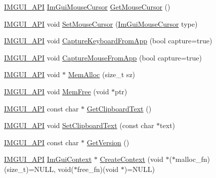 \begin{DoxyCompactItemize}
\mbox{\hyperlink{imgui_8h_a43829975e84e45d1149597467a14bbf5}{I\+M\+G\+U\+I\+\_\+\+A\+PI}} \mbox{\hyperlink{imgui_8h_a9223d6c82bb5d12c2eab5f829ca520ef}{Im\+Gui\+Mouse\+Cursor}} \mbox{\hyperlink{namespace_im_gui_a3b955bb840a2411f7c19ac6687d57392}{Get\+Mouse\+Cursor}} ()
\item 
\mbox{\hyperlink{imgui_8h_a43829975e84e45d1149597467a14bbf5}{I\+M\+G\+U\+I\+\_\+\+A\+PI}} void \mbox{\hyperlink{namespace_im_gui_ae212a3516efcba50a684df202c8e63ad}{Set\+Mouse\+Cursor}} (\mbox{\hyperlink{imgui_8h_a9223d6c82bb5d12c2eab5f829ca520ef}{Im\+Gui\+Mouse\+Cursor}} type)
\item 
\mbox{\hyperlink{imgui_8h_a43829975e84e45d1149597467a14bbf5}{I\+M\+G\+U\+I\+\_\+\+A\+PI}} void \mbox{\hyperlink{namespace_im_gui_af382f9360d73917a9e9c0d26b5797552}{Capture\+Keyboard\+From\+App}} (bool capture=true)
\item 
\mbox{\hyperlink{imgui_8h_a43829975e84e45d1149597467a14bbf5}{I\+M\+G\+U\+I\+\_\+\+A\+PI}} void \mbox{\hyperlink{namespace_im_gui_a3a86fbf0d334b30dc16fb44955f1ce54}{Capture\+Mouse\+From\+App}} (bool capture=true)
\item 
\mbox{\hyperlink{imgui_8h_a43829975e84e45d1149597467a14bbf5}{I\+M\+G\+U\+I\+\_\+\+A\+PI}} void $\ast$ \mbox{\hyperlink{namespace_im_gui_a15efb2cac4a54b35489c5984ba1b661a}{Mem\+Alloc}} (size\+\_\+t sz)
\item 
\mbox{\hyperlink{imgui_8h_a43829975e84e45d1149597467a14bbf5}{I\+M\+G\+U\+I\+\_\+\+A\+PI}} void \mbox{\hyperlink{namespace_im_gui_a269ec695c6e722ec3da85dae37f0675d}{Mem\+Free}} (void $\ast$ptr)
\item 
\mbox{\hyperlink{imgui_8h_a43829975e84e45d1149597467a14bbf5}{I\+M\+G\+U\+I\+\_\+\+A\+PI}} const char $\ast$ \mbox{\hyperlink{namespace_im_gui_a11837daee819fd90e17d80ab1eef1f99}{Get\+Clipboard\+Text}} ()
\item 
\mbox{\hyperlink{imgui_8h_a43829975e84e45d1149597467a14bbf5}{I\+M\+G\+U\+I\+\_\+\+A\+PI}} void \mbox{\hyperlink{namespace_im_gui_aa4824a1b351c063b4aff9b9f4fb5fd4d}{Set\+Clipboard\+Text}} (const char $\ast$text)
\item 
\mbox{\hyperlink{imgui_8h_a43829975e84e45d1149597467a14bbf5}{I\+M\+G\+U\+I\+\_\+\+A\+PI}} const char $\ast$ \mbox{\hyperlink{namespace_im_gui_a6488c3cfa6331c8a1e93769e580ce020}{Get\+Version}} ()
\item 
\mbox{\hyperlink{imgui_8h_a43829975e84e45d1149597467a14bbf5}{I\+M\+G\+U\+I\+\_\+\+A\+PI}} \mbox{\hyperlink{struct_im_gui_context}{Im\+Gui\+Context}} $\ast$ \mbox{\hyperlink{namespace_im_gui_a98a4fecf50da4fb3489cee71a72cc577}{Create\+Context}} (void $\ast$($\ast$malloc\+\_\+fn)(size\+\_\+t)=N\+U\+LL, void($\ast$free\+\_\+fn)(void $\ast$)=N\+U\+LL)

\end{DoxyCompactItemize}
